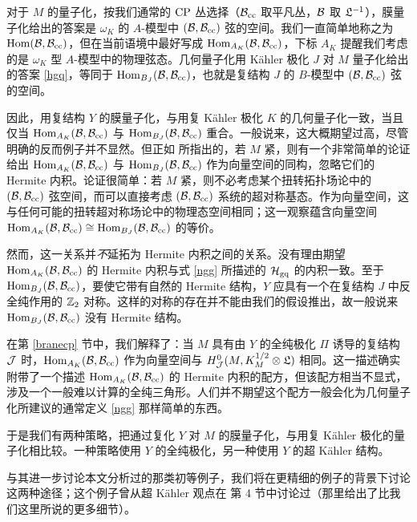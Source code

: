 对于 $M$ 的量子化，按我们通常的 $\CP$ 丛选择（$\B_\cc$ 取平凡丛，$\B$ 取 $\frL^{-1}$），膜量子化给出的答案是 $\omega_K$ 的 $A$-模型中 $(\B,\B_\cc)$ 弦的空间。我们一直简单地称之为 $\Hom(\B,\B_\cc)$，但在当前语境中最好写成
$\Hom_{A_K}(\B,\B_\cc)$，下标 $A_K$ 提醒我们考虑的是 $\omega_K$ 型 $A$-模型中的物理弦态。几何量子化用 Kähler 极化 $J$ 对 $M$ 量子化给出的答案 \eqref{hgq}，等同于 $\Hom_{B_J}(\B,\B_\cc)$，也就是复结构 $J$ 的 $B$-模型中 $(\B,\B_\cc)$ 弦的空间。

因此，用复结构 $Y$ 的膜量子化，与用复 Kähler 极化 $K$ 的几何量子化一致，当且仅当
$\Hom_{A_K}(\B,\B_\cc)$ 与 $\Hom_{B_J}(\B,\B_\cc)$ 重合。一般说来，这大概期望过高，尽管明确的反而例子并不显然。但正如 \cite{GW} 所指出的，若 $M$ 紧，则有一个非常简单的论证给出 $\Hom_{A_K}(\B,\B_\cc)$ 与 $\Hom_{B_J}(\B,\B_\cc)$ 作为向量空间的同构，忽略它们的 Hermite 内积。论证很简单：若 $M$ 紧，则不必考虑某个扭转拓扑场论中的 $(\B,\B_\cc)$ 弦空间，而可以直接考虑 $(\B,\B_\cc)$ 系统的超对称基态。作为向量空间，这与任何可能的扭转超对称场论中的物理态空间相同；这一观察蕴含向量空间 $\Hom_{A_K}(\B,\B_\cc)\cong\Hom_{B_J}(\B,\B_\cc)$ 的等价。

然而，这一关系并\emph{不}延拓为 Hermite 内积之间的关系。没有理由期望 $\Hom_{A_K}(\B,\B_\cc)$ 的 Hermite 内积与式 \eqref{ngg} 所描述的 $\H_\gq$ 的内积一致。至于 $\Hom_{B_J}(\B,\B_\cc)$，要使它带有自然的 Hermite 结构，$Y$ 应具有一个在复结构 $J$ 中反全纯作用的 $\Z_2$ 对称。这样的对称的存在并不能由我们的假设推出，故一般说来 $\Hom_{B_J}(\B,\B_\cc)$ 没有 Hermite 结构。

在第 \ref{branecp} 节中，我们解释了：当 $M$ 具有由 $Y$ 的全纯极化 $\varPi$ 诱导的复结构 $\J$ 时，$\Hom_{A_K}(\B,\B_\cc)$ 作为向量空间与 $H^0_\J(M,K_M^{1/2}\otimes\frL)$ 相同。这一描述确实附带了一个描述 $\Hom_{A_K}(\B,\B_\cc)$ 的 Hermite 内积的配方，但该配方相当不显式，涉及一个一般难以计算的全纯三角形。人们并不期望这个配方一般会化为几何量子化所建议的通常定义 \eqref{ngg} 那样简单的东西。

于是我们有两种策略，把通过复化 $Y$ 对 $M$ 的膜量子化，与用复 Kähler 极化的量子化相比较。一种策略使用 $Y$ 的全纯极化，另一种使用 $Y$ 的超 Kähler 结构。

与其进一步讨论本文分析过的那类初等例子，我们将在更精细的例子的背景下讨论这两种途径；这个例子曾从超 Kähler 观点在 \cite{GW} 第 4 节中讨论过（那里给出了比我们这里所说的更多细节）。
